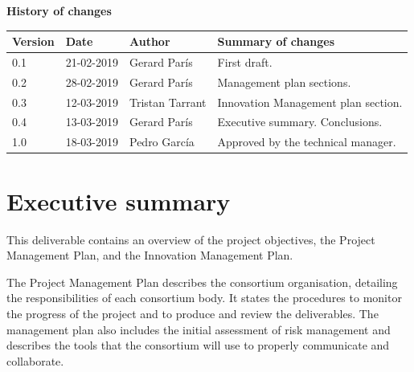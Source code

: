 \documentclass[a4paper,11pt]{article}
\begin{document}
{
\def\arraystretch{1.5} %

{\LARGE \textbf{History of changes}}

\begin{center}
    \begin{tabular}{ | l | l | p{3cm} | p{9cm} | }
    \hline
    \rowcolor[gray]{0.8}
    \textbf{Version} &
    \textbf{Date} &
    \textbf{Author} &
    \textbf{Summary of changes} \\ \hline

    0.1 & 21-02-2019 & Gerard París & First draft. \\ \hline
    0.2 & 28-02-2019 & Gerard París & Management plan sections. \\ \hline
    0.3 & 12-03-2019 & Tristan Tarrant & Innovation Management plan section. \\ \hline
    0.4 & 13-03-2019 & Gerard París & Executive summary. Conclusions. \\ \hline
    1.0 & 18-03-2019 & Pedro García & Approved by the technical manager. \\ \hline
    \end{tabular}
\end{center}
}


\clearpage\setcounter{page}{1}\pagestyle{HeadAndFootPageTOC}

\tableofcontents %
%




\clearpage\setcounter{page}{1}\pagestyle{HeadAndFootPage}

\section{Executive summary}

This deliverable contains an overview of the project objectives, the Project Management Plan, and the Innovation Management Plan.

The Project Management Plan describes the consortium organisation, detailing the responsibilities of each consortium body. It states the procedures to monitor the progress of the project and to produce and review the deliverables. The management plan also includes the initial assessment of risk management and describes the tools that the consortium will use to properly communicate and collaborate.
\end{document}
